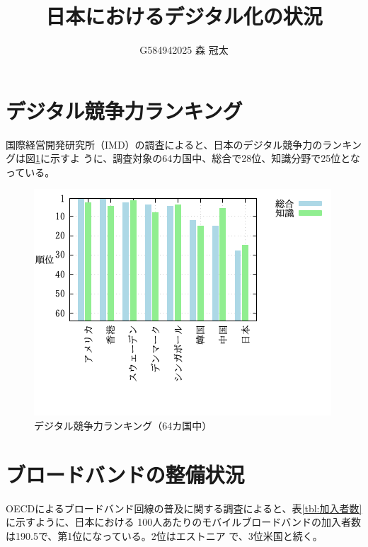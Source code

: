 \documentclass[a4paper,11pt,dvipdfmx]{ujarticle}
\title{日本におけるデジタル化の状況}
\author{G584942025 森 冠太}
\begin{document}
\maketitle 

 \section{デジタル競争力ランキング}

国際経営開発研究所（IMD）の調査\cite{imd}によると、日本のデジタル競争力のランキングは図\ref{fig:ランキング}に示すよ
うに、調査対象の64カ国中、総合で28位、知識分野で25位となっている。
\begin{figure}[htbp]
    \centering
    \includegraphics[width=0.7\linewidth]{fig31.png}
    \caption{デジタル競争力ランキング（64カ国中）}\label{fig:ランキング}
\end{figure}

 
\newpage
\maketitle
 
 \section{ブロードバンドの整備状況}

OECDによるブロードバンド回線の普及に関する調査\cite{oecd}によると、表\ref{tbl:加入者数}に示すように、日本における 100人あたりのモバイルブロードバンドの加入者数は190.5で、第1位になっている。2位はエストニア
で、3位米国と続く。
\end{document}
